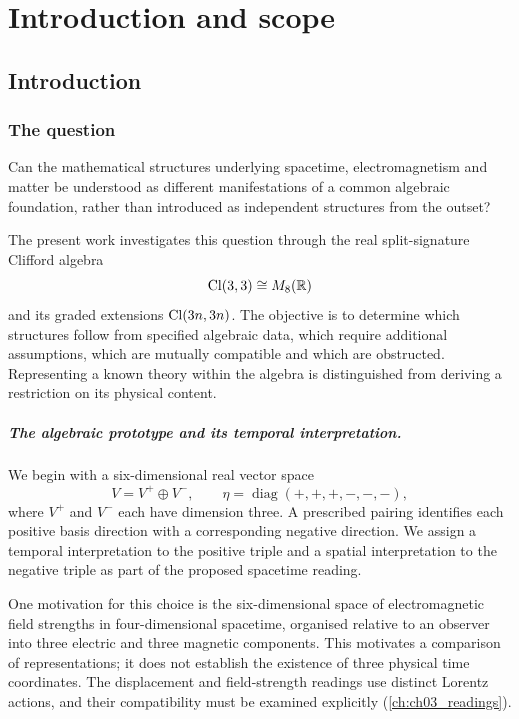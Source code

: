 \chapter*{Introduction and scope}
\setcounter{section}{0}



\section{Introduction}
\label{sec:intro}

\subsection{The question}
\label{sec:question}

Can the mathematical structures underlying spacetime, electromagnetism and matter be understood as different manifestations of a common
algebraic foundation, rather than introduced as independent structures from the outset?

The present work investigates this question through the real split-signature Clifford algebra
\[
\mathrm{Cl}(3,3)\cong M_8(\mathbb{R})
\]
and its graded extensions $\mathrm{Cl}(3n,3n)$. The objective is to determine which structures follow from specified algebraic data, which require
additional assumptions, which are mutually compatible and which are obstructed. Representing a known theory within the algebra is
distinguished from deriving a restriction on its physical content.

\paragraph{The algebraic prototype and its temporal interpretation.} We begin with a six-dimensional real vector space
\[
V=V^+\oplus V^-,\qquad \eta=\operatorname{diag}(+,+,+,-,-,-),
\]
where $V^+$ and $V^-$ each have dimension three. A prescribed pairing identifies each positive basis direction with a corresponding
negative direction. We assign a temporal interpretation to the positive triple and a spatial interpretation to the negative triple as part
of the proposed spacetime reading.

One motivation for this choice is the six-dimensional space of electromagnetic field strengths in four-dimensional spacetime, organised
relative to an observer into three electric and three magnetic components. This motivates a comparison of representations; it does not
establish the existence of three physical time coordinates. The displacement and field-strength readings use distinct Lorentz actions, and
their compatibility must be examined explicitly (\cref{ch:ch03_readings}).

